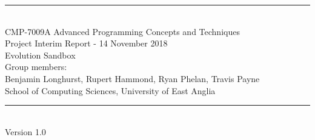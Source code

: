 \documentclass[a4paper, oneside, 11pt]{report}
\begin{document}
\begin{titlepage}
\begin{center}
\rule{12cm}{1mm} \\
\vspace{1cm}
{\large  CMP-7009A Advanced Programming Concepts and Techniques}
\vspace{7.5cm}
\\{\Large Project Interim Report - 14 November 2018}
\vspace{1.5cm}
\\{\LARGE Evolution Sandbox}
\vspace{1.0cm}
\\{\Large Group members: \\ Benjamin Longhurst, Rupert Hammond, Ryan Phelan, Travis Payne}
\vspace{10.0cm}
\\{\large School of Computing Sciences, University of East Anglia}
\\ \rule{12cm}{0.5mm}
\\ \hspace{8.5cm} {\large Version 1.0}
\end{center}
\end{titlepage}


\setcounter{page}{1}


\begin{abstract}
[TODO: write this] An abstract is a brief summary (maximum 250 words) of your entire project. It should cover your objectives, your methodology used, how you implemented the methodology for your specific results and what your final results are, your final outcome or deliverable and conclusion. You do not cover literature reviews or background in an abstract nor should you use abbreviations or acronyms. In the remainder of the report the chapter titles are suggestions and can be changed (or you can add more chapters if you wish to do so). This template is designed to help you write a clear report but you are welcome to modify it (at your peril ...). Finally, a guideline in size is approximately 3,500 words (not including abstract, captions and references) but no real limit on figures, tables, etc.
\end{abstract}
\end{document}
